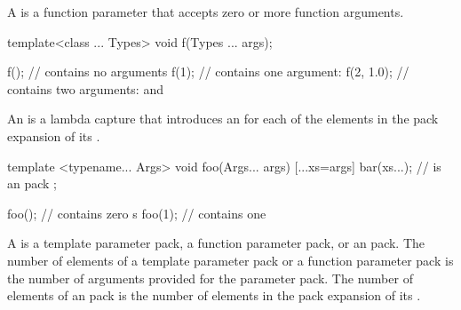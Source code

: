 \pnum
A  is a function parameter
that accepts zero or more function arguments.
\begin{example}
\begin{codeblock}
template<class ... Types> void f(Types ... args);

f();                            //  contains no arguments
f(1);                           //  contains one argument: 
f(2, 1.0);                      //  contains two arguments:  and 
\end{codeblock}
\end{example}

\pnum
An 
is a lambda capture that introduces an 
for each of the elements in the pack expansion of its .
\begin{example}
\begin{codeblock}
template <typename... Args>
void foo(Args... args) {
    [...xs=args]{
        bar(xs...);             //  is an  pack
    };
}

foo();                          //  contains zero s
foo(1);                         //  contains one 
\end{codeblock}
\end{example}

\pnum
A  is
a template parameter pack,
a function parameter pack,
or an  pack.
The number of elements of a template parameter pack
or a function parameter pack
is the number of arguments provided for the parameter pack.
The number of elements of an  pack
is the number of elements in the pack expansion of its .

